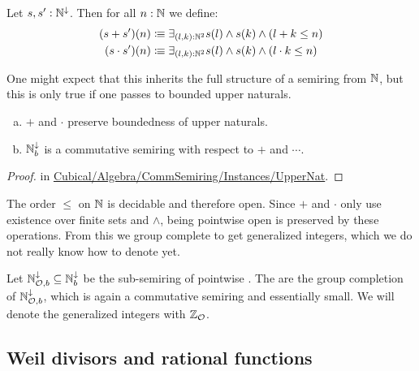 \begin{definition}
  Let $s,s':\mathbb{N}^\downarrow$. Then for all $n:\mathbb{N}$ we define:
  \begin{align*}
    (s+s')(n)&\vcentcolon\mspace{-1.2mu}\equiv \exists_{(l,k):\mathbb{N}^2} s(l)\wedge s(k)\wedge (l+k\leq n) \\
    (s\cdot s')(n)&\vcentcolon\mspace{-1.2mu}\equiv \exists_{(l,k):\mathbb{N}^2} s(l)\wedge s(k)\wedge (l\cdot k\leq n) 
  \end{align*}
\end{definition}

One might expect that this inherits the full structure of a semiring from $\mathbb{N}$,
but this is only true if one passes to bounded upper naturals.

\begin{proposition}
  \begin{enumerate}[(a)]
  \item $+$ and $\cdot$ preserve boundedness of upper naturals.
  \item $\mathbb{N}^\downarrow_b$ is a commutative semiring with respect to $+$ and $\cdots$.
  \end{enumerate}
\end{proposition}

\begin{proof}
  \cite{cubical-library} in \href{https://github.com/agda/cubical/blob/master/Cubical/Algebra/CommSemiring/Instances/UpperNat.agda}{Cubical/Algebra/CommSemiring/Instances/UpperNat}.
\end{proof}

The order $\leq$ on $\mathbb{N}$ is decidable and therefore open.
Since $+$ and $\cdot$ only use existence over finite sets and $\wedge$,
being pointwise open is preserved by these operations.
From this we group complete to get generalized integers, which we do not really know how to denote yet.

\begin{definition}
  Let $\mathbb{N}_{\mathcal O,b}^\downarrow\subseteq \mathbb{N}_b^\downarrow$
  be the sub-semiring of pointwise .
  The  are the group completion of $\mathbb{N}_{\mathcal O,b}^\downarrow$, which is again a commutative semiring and essentially small. We will denote the generalized integers with $\mathbb{Z}_{\mathcal O}$.
\end{definition}

\subsection{Weil divisors and rational functions}

